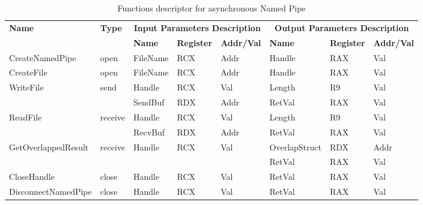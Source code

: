 \documentclass[12pt,oneside]{book}
\begin{document}
\begin{table}[H]
  \centering
  \caption{Functions descriptor for asynchronous Named Pipe}
  \label{nameasyn}
\begin{tabular}{|l|l|l|l|l|l|l|l|}
\hline
             \multirow{2}{*}{{\textbf{Name}}} & \multirow{2}{*}{{\textbf{Type}}} & \multicolumn{3}{c|}{\textbf{Input Parameters Description}} & \multicolumn{3}{c|}{\textbf{Output Parameters Description}} \\
              \cline{3-8} 
             & & \textbf{Name}& \textbf{Register} & \textbf{Addr/Val} & \textbf{Name}& \textbf{Register} &  \textbf{Addr/Val}  \\
             \hline
      CreateNamedPipe
       &open & FileName & RCX  & Addr &  Handle & RAX & Val\\
      \hline         
      CreateFile
       &open & FileName & RCX & Addr&  Handle & RAX & Val\\ 
      \hline              
      \multirow{2}{*}{WriteFile}
       &\multirow{2}{*}{send} &  Handle & RCX & Val & Length & R9 & Val\\
        \cline{3-8} 
       & & SendBuf & RDX & Addr & RetVal& RAX & Val\\
      \hline            
      \multirow{2}{*}{ReadFile}
       &\multirow{2}{*}{receive} &  Handle & RCX & Val& Length & R9 & Val\\
        \cline{3-8} 
       & & RecvBuf & RDX  & Addr & RetVal& RAX & Val\\
      \hline    
           \multirow{2}{*}{GetOverlappedResult} &
       \multirow{2}{*}{receive} &  \multirow{2}{*}{Handle} & \multirow{2}{*}{RCX} & \multirow{2}{*}{Val} &OverlapStruct &RDX & Addr\\
               \cline{6-8} 
       & &  &   &  & RetVal& RAX & Val\\
      \hline     
      CloseHandle &
       close &  Handle & RCX & Val & RetVal& RAX & Val\\
      \hline            
      DisconnectNamedPipe &
      close &  Handle & RCX & Val & RetVal& RAX & Val\\
      \hline               
  \end{tabular}  
\end{table}
\end{document}

